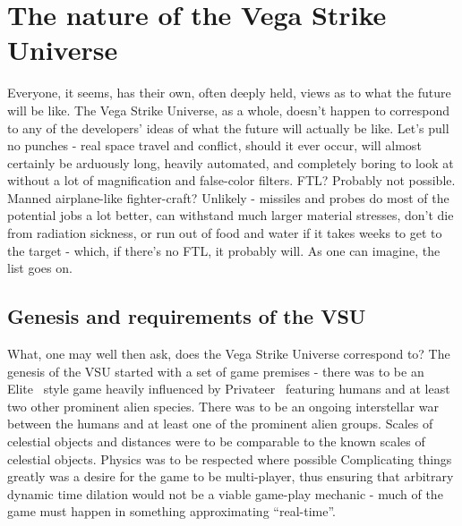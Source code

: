\section{The nature of the Vega Strike Universe}
\label{sec:VSUflavor}
Everyone, it seems, has their own, often deeply held, views as to what
the future will be like. The Vega Strike Universe, as a whole, doesn't
happen to correspond to any of the developers' ideas of what the future
will actually be like. Let's pull no punches - real space travel and
conflict, should it ever occur, will almost certainly be arduously
long, heavily automated, and completely boring to look at without a
lot of magnification and false-color filters. FTL? Probably not
possible. Manned airplane-like fighter-craft? Unlikely - missiles and
probes do most of the potential jobs a lot better, can withstand much
larger material stresses, don't die from radiation sickness, or run
out of food and water if it takes weeks to get to the target - which,
if there's no FTL, it probably will. As one can imagine, the list goes
on.

\subsection{Genesis and requirements of the VSU}
What, one may well then ask, does the Vega Strike Universe correspond
to? The genesis of the VSU started with a set of game premises - there
was to be an Elite~\cite{Elite} style game heavily influenced by
Privateer~\cite{Privateer} featuring humans and at least two other
prominent alien species. There was to be an ongoing interstellar war
between the humans and at least one of the prominent alien
groups. Scales of celestial objects and distances were to be
comparable to the known scales of celestial objects. Physics was to be
respected where possible Complicating things greatly was a desire for
the game to be multi-player, thus ensuring that arbitrary dynamic time
dilation would not be a viable game-play mechanic - much of the game
must happen in something approximating ``real-time''.

